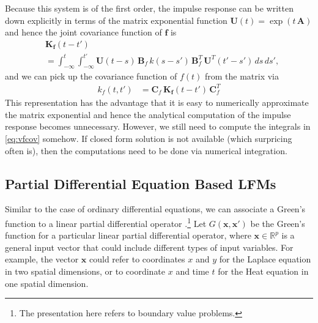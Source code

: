 \documentclass[journal]{IEEEtran}
\begin{document}
Because this system is of the first order, the impulse response can be written down explicitly in terms of the matrix exponential function $\mathbf{U}(t) = \exp(t \, \mathbf{A})$ and hence the joint covariance function of $\mathbf{f}$ is
%
\begin{equation}
\begin{split}
  &\mathbf{K}_\mathbf{f}(t - t')
  \\ &
  =
  \int_{-\infty}^{t} \int_{-\infty}^{t'}
  \mathbf{U}(t - s) \, \mathbf{B}_f \, k(s - s') \,
  \mathbf{B}_f^T \, \mathbf{U}^T(t' - s') \, ds \, ds',
\end{split}
\label{eq:vfcov}
\end{equation}
%
and we can pick up the covariance function of $f(t)$ from the matrix via
%
\begin{equation}
\begin{split}
  k_f(t,t') &=
  \mathbf{C}_f \, \mathbf{K}_\mathbf{f}(t - t') \, \mathbf{C}_f^T
\end{split}
\label{eq:fcov2}
\end{equation}
%
This representation has the advantage that it is easy to numerically approximate the matrix exponential and hence the analytical computation of the impulse response becomes unnecessary. However, we still need to compute the integrals in \eqref{eq:vfcov} somehow. If closed form solution is not available (which surpricing often is), then the computations need to be done via numerical integration.



\subsection{Partial Differential Equation Based LFMs}
%
Similar to the case of ordinary differential equations, we can associate a Green's function to a linear partial differential
operator \cite{Myintu:LPDEBook:2006, Polyanin:Handbook02}.\footnote{The presentation here refers to boundary value
problems.}
Let $G(\mathbf{x}, \mathbf{x}')$ be the Green's function for a
particular linear partial differential operator, where $\mathbf{x}\in\mathbb{R}^p$ is a general input vector that could
include different types of input variables. For example, the vector $\mathbf{x}$ could refer to
coordinates $x$ and $y$ for the Laplace equation in two spatial dimensions, or to coordinate $x$ and time
$t$ for the Heat equation in one spatial dimension.
\end{document}
